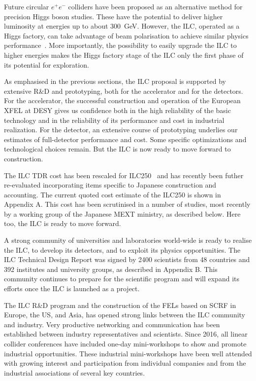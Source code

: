 \documentclass[%
 reprint,
 amsmath,amssymb,
 aps,
]{revtex4-1}
\def\ee{e^+e^-}
\begin{document}
Future circular $\ee$ colliders have been proposed as an alternative 
method for precision Higgs boson studies.  These have the potential to
deliver higher luminosity at energies up to about 300~GeV.  However,
the ILC, operated as a Higgs factory, can take advantage of  beam 
polarisation to achieve similar physics
performance~\cite{Barklow:2017suo}.
More importantly, the possibility to easily upgrade the ILC to higher
energies makes the Higgs factory stage of the  ILC  only
the first phase of its potential for exploration. 

As emphasised in the previous sections, the ILC proposal
is supported by extensive R\&D and prototyping, both for the
accelerator and for the detectors.  For the accelerator,  
the successful construction and
operation 
of the European XFEL at DESY gives
us confidence both in the high reliability of the basic
technology and in the reliability of its performance and cost in 
industrial realization.   For the detector, an extensive course of
prototyping underlies our estimates of full-detector performance 
and cost.  Some specific optimizations and technological choices remain.
But the ILC is now ready to move forward to construction. 

 The ILC TDR
cost has been 
 rescaled for ILC250~\cite{Evans:2017rvt} and has recently been futher
 re-evaluated incorporating items specific to Japanese construction
 and accounting.  The current quoted cost estimate 
of the ILC250 is shown in Appendix A. 
 This cost has  been scrutinised in a number of
studies, most recently by a working group of the Japanese MEXT ministry, as described below.  Here too, the ILC is ready to move forward.

A strong community of universities and laboratories world-wide is
ready to realise the ILC, to develop its detectors, and to exploit its
physics opportunities. 
 The ILC Technical Design Report was signed by
2400 scientists from 48 countries and 392 institutes and university
groups,
 as described in Appendix B.  This community continues
 to prepare for the scientific program and
will expand its efforts once the ILC is launched as a project.
 
The ILC R\&D program and the construction of the FELs based on
SCRF in Europe, the US, and Asia, has opened strong links between the ILC
community 
and industry.  Very productive
 networking and communication has been established between industry
 representatives and scientists. Since 2016,
 all linear collider conferences have included one-day mini-workshops
 to show and promote industrial opportunities. 
These industrial mini-workshops have been well attended
 with growing  interest and participation from individual companies and from the industrial associations of several key countries.
 
\end{document}
